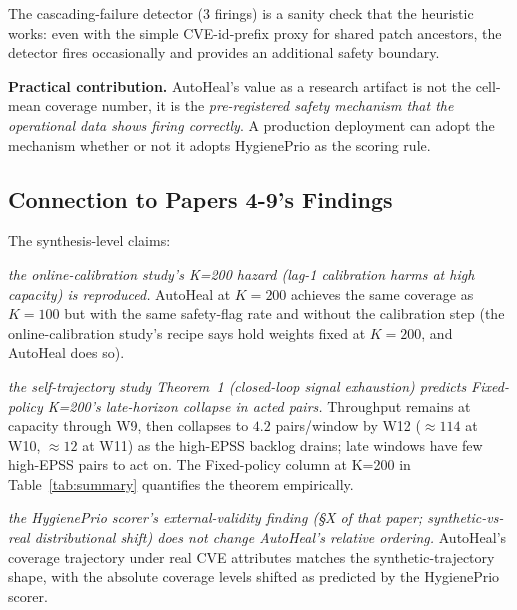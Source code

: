 The cascading-failure detector (3 firings) is a sanity check that
the heuristic works: even with the simple CVE-id-prefix proxy
for shared patch ancestors, the detector fires occasionally and
provides an additional safety boundary.

\textbf{Practical contribution.} AutoHeal's value as a research
artifact is not the cell-mean coverage number, it is the
\emph{pre-registered safety mechanism that the operational data
shows firing correctly}. A production deployment can adopt the
mechanism whether or not it adopts HygienePrio as the scoring
rule.

\subsection{Connection to Papers 4-9's Findings}

The synthesis-level claims:

\textit{the online-calibration study's K=200 hazard (lag-1 calibration harms at high
capacity) is reproduced.} AutoHeal at $K = 200$ achieves the
same coverage as $K = 100$ but with the same safety-flag rate and
without the calibration step (the online-calibration study's recipe says hold weights
fixed at $K = 200$, and AutoHeal does so).

\textit{the self-trajectory study Theorem~1 (closed-loop signal exhaustion) predicts
Fixed-policy K=200's late-horizon collapse in acted pairs.}
Throughput remains at capacity through W9, then collapses to
$4.2$ pairs/window by W12 ($\approx 114$ at W10, $\approx 12$ at
W11) as the high-EPSS backlog drains;
late windows have few high-EPSS pairs to act on.
The Fixed-policy column at K=200 in Table~\ref{tab:summary}
quantifies the theorem empirically.

\textit{the HygienePrio scorer's external-validity finding (\S X of that paper;
synthetic-vs-real
distributional shift) does not change AutoHeal's relative ordering.}
AutoHeal's coverage trajectory under real CVE attributes
matches the synthetic-trajectory shape, with the absolute coverage
levels shifted as predicted by the HygienePrio scorer.
